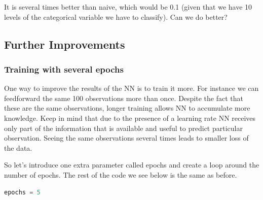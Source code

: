   It is several times better than naive, which would be 0.1 (given that we have 10 levels of the categorical variable we have to classify). Can we do better?
  
\subsection{Further Improvements}

\subsubsection{Training with several epochs}
   
One way to improve the results of the NN is to train it more. For instance we can feedforward the same 100 observations more than once. Despite the fact that these are the same observations, longer training allows NN to accumulate more knowledge. Keep in mind that due to the presence of a learning rate NN receives only part of the information that is available and useful to predict particular observation. Seeing the same observations several times leads to smaller loss of the data.
   
So let's introduce one extra parameter called epochs and create a loop around the number of epochs. The rest of the code we see below is the same as before.
   
\begin{lstlisting}[language=Python]   
    epochs = 5
\end{lstlisting}

